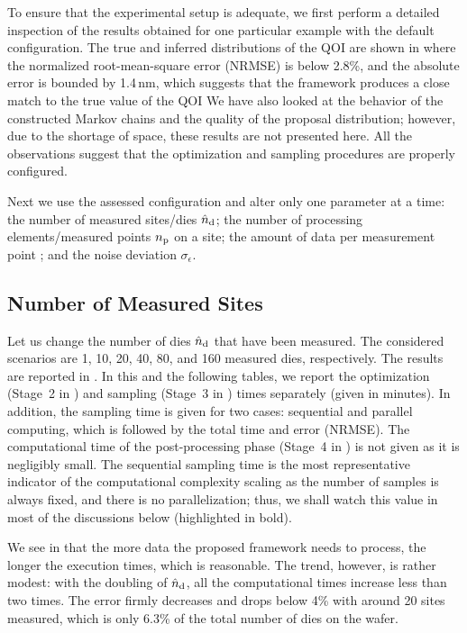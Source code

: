 To ensure that the experimental setup is adequate, we first perform a detailed
inspection of the results obtained for one particular example with the default
configuration. The true and inferred distributions of the \ac{QOI} are shown in
 where the normalized root-mean-square error (NRMSE) is below
2.8\%, and the absolute error is bounded by 1.4$\,$nm, which suggests that the
framework produces a close match to the true value of the \ac{QOI} We have also
looked at the behavior of the constructed Markov chains and the quality of the
proposal distribution; however, due to the shortage of space, these results are
not presented here. All the observations suggest that the optimization and
sampling procedures are properly configured.

Next we use the assessed configuration and alter only one parameter at a time:
the number of measured sites/dies ${\hat{n}_\mathrm{d}}$; the number of processing
elements/measured points ${n_\mathrm{p}}$ on a site; the amount of data per measurement
point \ns; and the noise deviation $\sigma_\epsilon$.

\subsection{Number of Measured Sites}

Let us change the number of dies ${\hat{n}_\mathrm{d}}$ that have been measured. The considered
scenarios are 1, 10, 20, 40, 80, and 160 measured dies, respectively. The
results are reported in . In this and the following
tables, we report the optimization (Stage~2 in ) and sampling
(Stage~3 in ) times separately (given in minutes). In addition,
the sampling time is given for two cases: sequential and parallel computing,
which is followed by the total time and error (NRMSE). The computational time of
the post-processing phase (Stage~4 in ) is not given as it is
negligibly small. The sequential sampling time is the most representative
indicator of the computational complexity scaling as the number of samples is
always fixed, and there is no parallelization; thus, we shall watch this value
in most of the discussions below (highlighted in bold).

We see in  that the more data the proposed framework
needs to process, the longer the execution times, which is reasonable. The
trend, however, is rather modest: with the doubling of ${\hat{n}_\mathrm{d}}$, all the
computational times increase less than two times. The error firmly decreases and
drops below 4\% with around 20 sites measured, which is only 6.3\% of the total
number of dies on the wafer.


